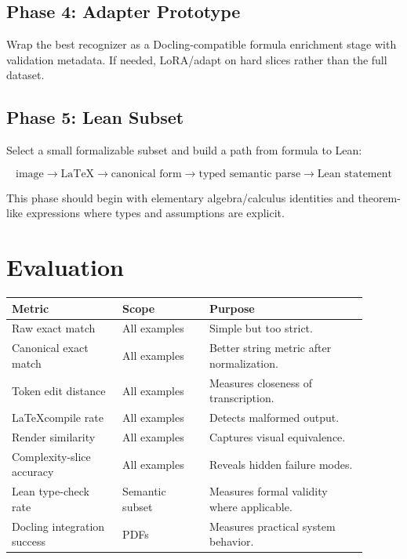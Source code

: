 \documentclass[11pt]{article}
\begin{document}
\subsection{Phase 4: Adapter Prototype}

Wrap the best recognizer as a Docling-compatible formula enrichment stage with validation metadata. If needed, LoRA/adapt on hard slices rather than the full dataset.

\subsection{Phase 5: Lean Subset}

Select a small formalizable subset and build a path from formula to Lean:

\[
\text{image} \rightarrow \text{LaTeX} \rightarrow \text{canonical form} \rightarrow \text{typed semantic parse} \rightarrow \text{Lean statement}
\]

This phase should begin with elementary algebra/calculus identities and theorem-like expressions where types and assumptions are explicit.

\section{Evaluation}

\begin{longtable}{p{0.28\linewidth} p{0.22\linewidth} p{0.4\linewidth}}
\toprule
\textbf{Metric} & \textbf{Scope} & \textbf{Purpose} \\
\midrule
Raw exact match & All examples & Simple but too strict. \\
Canonical exact match & All examples & Better string metric after normalization. \\
Token edit distance & All examples & Measures closeness of transcription. \\
\LaTeX compile rate & All examples & Detects malformed output. \\
Render similarity & All examples & Captures visual equivalence. \\
Complexity-slice accuracy & All examples & Reveals hidden failure modes. \\
Lean type-check rate & Semantic subset & Measures formal validity where applicable. \\
Docling integration success & PDFs & Measures practical system behavior. \\
\bottomrule
\end{longtable}
\end{document}
